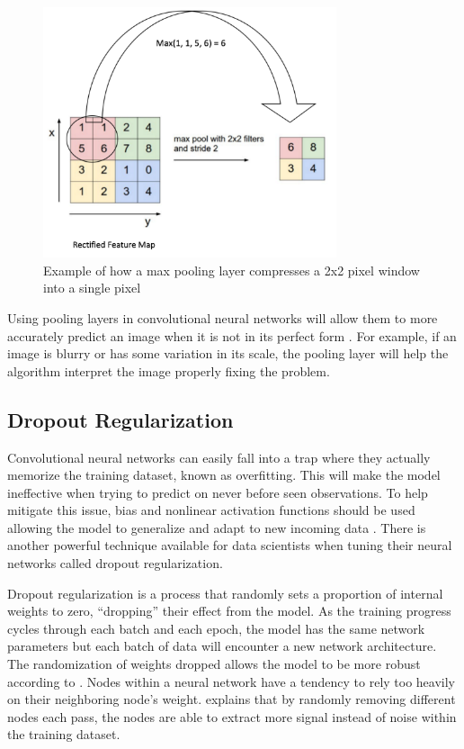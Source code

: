 \documentclass[5p,authoryear]{elsarticle}
\begin{document}
\begin{figure}[!h] 
    \centering
	\includegraphics[width=3.4in]{figures/Max-Pooling.png}
	\caption[]{Example of how a max pooling layer compresses a 2x2 pixel window into a single pixel} 
	\label{MaxPool} 
\end{figure}

Using pooling layers in convolutional neural networks will allow them to more accurately predict an image when it is not in its perfect form \citep{brownlee}. For example, if an image is blurry or has some variation in its scale, the pooling layer will help the algorithm interpret the image properly fixing the problem. 


\subsection{Dropout Regularization}


Convolutional neural networks can easily fall into a trap where they actually memorize the training dataset, known as overfitting. This will make the model ineffective when trying to predict on never before seen observations. To help mitigate this issue, bias and nonlinear activation functions should be used allowing the model to generalize and adapt to new incoming data \citep{brownlee1}. There is another powerful technique available for data scientists when tuning their neural networks called dropout regularization.


Dropout regularization is a process that randomly sets a proportion of internal weights to zero, “dropping” their effect from the model. As the training progress cycles through each batch and each epoch, the model has the same network parameters but each batch of data will encounter a new network architecture. The randomization of weights dropped allows the model to be more robust according to \citep{albon}. Nodes within a neural network have a tendency to rely too heavily on their neighboring node’s weight. \cite{brownlee} explains that by randomly removing different nodes each pass, the nodes are able to extract more signal instead of noise within the training dataset.
\end{document}
